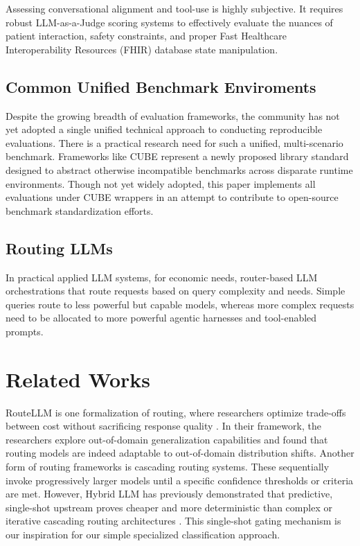 \documentclass[conference]{IEEEtran}
\begin{document}
Assessing conversational alignment and tool-use is highly subjective. It requires robust LLM-as-a-Judge scoring systems to effectively evaluate the nuances of patient interaction, safety constraints, and proper Fast Healthcare Interoperability Resources (FHIR) database state manipulation.

\subsection{Common Unified Benchmark Enviroments}

Despite the growing breadth of evaluation frameworks, the community has not yet adopted a single unified technical approach to conducting reproducible evaluations. There is a practical research need for such a unified, multi-scenario benchmark. 
Frameworks like CUBE \cite{lacoste2026cubestandardunifyingagent} represent a newly proposed library standard designed to abstract  otherwise incompatible benchmarks across disparate runtime environments. Though not yet widely adopted, this paper implements all evaluations under CUBE wrappers in an attempt to contribute to open-source benchmark standardization efforts.

\subsection{Routing LLMs}

In practical applied LLM systems, for economic needs, router-based LLM orchestrations that route requests based on query complexity and needs. Simple queries route to less powerful but capable models, whereas more complex requests need to be allocated to more powerful agentic harnesses and tool-enabled prompts. 

\section{Related Works}

RouteLLM is one formalization of routing, where researchers optimize trade-offs between cost without sacrificing response quality \cite{ong2025routellmlearningroutellms}. In their framework, the researchers explore out-of-domain generalization capabilities and found that routing models are indeed adaptable to out-of-domain distribution shifts. Another form of routing frameworks is cascading routing systems. These sequentially invoke progressively larger models until a specific confidence thresholds or criteria are met. However, Hybrid LLM has previously demonstrated that predictive, single-shot upstream proves cheaper and more deterministic than complex or iterative cascading routing architectures \cite{ding2024hybridllmcostefficientqualityaware}. This single-shot gating mechanism is our inspiration for our simple specialized classification approach.
\end{document}
